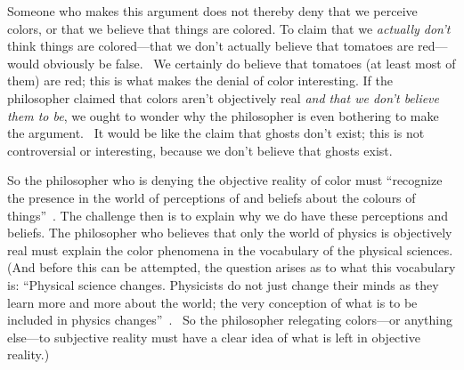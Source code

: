 \documentclass[11pt]{article}
\newenvironment{squote}{\begin{quote}\begin{singlespace}}{\end{singlespace}\end{quote}}
\begin{document}
\begin{spacing}{1.5}
Someone who makes this argument does not thereby deny that we perceive colors, or that we believe that things are colored. To claim that we {\em actually don't} think things are colored---that we don't actually believe that tomatoes are red---would obviously be false.%
\ We certainly do believe that tomatoes (at least most of them) are red; this is what makes the denial of color interesting. If the philosopher claimed that colors aren't objectively real {\em and that we don't believe them to be}, we ought to wonder why the philosopher is even bothering to make the argument.%
%
%
\ It would be like the claim that ghosts don't exist; this is not controversial or interesting, because we don't believe that ghosts exist.

So the philosopher who is denying the objective reality of color must ``recognize the presence in the world of perceptions of and beliefs about the colours of things''~\citep[199]{stroud2000a}. The challenge then is to explain why we do have these perceptions and beliefs. The philosopher who believes that only the world of physics is objectively real must explain the color phenomena in the vocabulary of the physical sciences. (And before this can be attempted, the question arises as to what this vocabulary is: ``Physical science changes. Physicists do not just change their minds as they learn more and more about the world; the very conception of what is to be included in physics changes''~\citep[53]{stroud2000a}.%
%
%
\ So the philosopher relegating colors---or anything else---to subjective reality must have a clear idea of what is left in objective reality.)%


\end{spacing}
\end{document}
